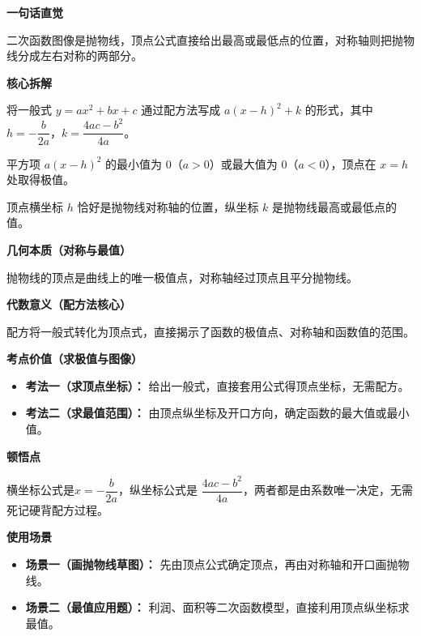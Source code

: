 \begin{explanationbox}
	\textbf{\textcolor{CExplanation}{一句话直觉}}

	二次函数图像是抛物线，顶点公式直接给出最高或最低点的位置，对称轴则把抛物线分成左右对称的两部分。

	\medskip
	\textbf{\textcolor{CExplanation}{核心拆解}}
	\begin{description}[style=nextline, leftmargin=2.8em, labelsep=0.5em, itemsep=0.45em]
		\item[\textbf{要点一（配方变形）：}] 将一般式 $y=ax^2+bx+c$ 通过配方法写成 $a(x-h)^2+k$ 的形式，其中 $h=-\dfrac{b}{2a}$，$k=\dfrac{4ac-b^2}{4a}$。
		\item[\textbf{要点二（顶点来源）：}] 平方项 $a(x-h)^2$ 的最小值为 $0$（$a>0$）或最大值为 $0$（$a<0$），顶点在 $x=h$ 处取得极值。
		\item[\textbf{要点三（对称轴关系）：}] 顶点横坐标 $h$ 恰好是抛物线对称轴的位置，纵坐标 $k$ 是抛物线最高或最低点的值。
	\end{description}

	\medskip
	\textbf{\textcolor{CExplanation}{几何本质（对称与最值）}}

	抛物线的顶点是曲线上的唯一极值点，对称轴经过顶点且平分抛物线。

	\medskip
	\textbf{\textcolor{CExplanation}{代数意义（配方法核心）}}

	配方将一般式转化为顶点式，直接揭示了函数的极值点、对称轴和函数值的范围。

	\medskip
	\textbf{\textcolor{CExplanation}{考点价值（求极值与图像）}}
	\begin{itemize}[leftmargin=*, itemsep=0.5em, topsep=0.4em]
		\item \textbf{考法一（求顶点坐标）：} 给出一般式，直接套用公式得顶点坐标，无需配方。
		\item \textbf{考法二（求最值范围）：} 由顶点纵坐标及开口方向，确定函数的最大值或最小值。
	\end{itemize}

	\medskip
	\textbf{\textcolor{CExplanation}{顿悟点}}

	横坐标公式是$x=-\dfrac{b}{2a}$，纵坐标公式是 $\dfrac{4ac-b^2}{4a}$，两者都是由系数唯一决定，无需死记硬背配方过程。

	\medskip
	\textbf{\textcolor{CExplanation}{使用场景}}
	\begin{itemize}[leftmargin=*, itemsep=0.5em, topsep=0.4em]
		\item \textbf{场景一（画抛物线草图）：} 先由顶点公式确定顶点，再由对称轴和开口画抛物线。
		\item \textbf{场景二（最值应用题）：} 利润、面积等二次函数模型，直接利用顶点纵坐标求最值。
	\end{itemize}
\end{explanationbox}
